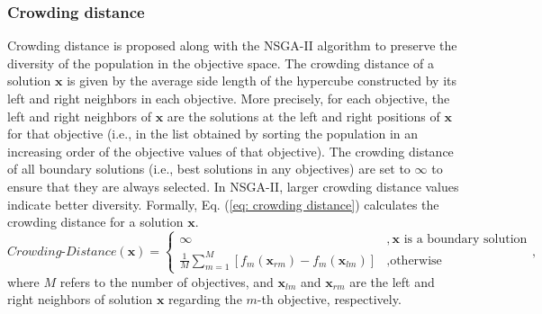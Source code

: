 \subsubsection{Crowding distance}
Crowding distance is proposed along with the NSGA-II algorithm\cite{NSGAII} to preserve the diversity of the population in the objective space. The crowding distance of a solution $\boldsymbol{x}$ is given by the average side length of the hypercube constructed by its left and right neighbors in each objective. More precisely, for each objective, the left and right neighbors of $\boldsymbol{x}$ are the solutions at the left and right positions of $\boldsymbol{x}$ for that objective (i.e., in the list obtained by sorting the population in an increasing order of the objective values of that objective). The crowding distance of all boundary solutions (i.e., best solutions in any objectives) are set to $\infty$ to ensure that they are always selected. In NSGA-II, larger crowding distance values indicate better diversity. Formally, Eq. (\ref{eq: crowding distance}) calculates the crowding distance for a solution $\boldsymbol{x}$.
\begin{equation}
	\textit{Crowding-Distance} (\boldsymbol{x}) =
	\begin{cases}
		\infty                                                                     & ,\boldsymbol{x} \text{ is a boundary solution} \\
		\frac{1}{M}\sum_{m=1}^M[f_m(\boldsymbol{x}_{rm})-f_m(\boldsymbol{x}_{lm})] & ,\text{otherwise}
	\end{cases},
	\label{eq: crowding distance}
\end{equation}
where $M$ refers to the number of objectives, and $\boldsymbol{x}_{lm}$ and $\boldsymbol{x}_{rm}$ are the left and right neighbors of solution $\boldsymbol{x}$ regarding the $m$-th objective, respectively.

